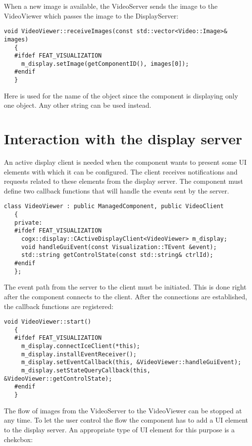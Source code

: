 When a new image is available, the VideoServer sends the image to the VideoViewer which
passes the image to the DisplayServer:

\begin{Verbatim}[fontsize=\scriptsize,gobble=3]
   void VideoViewer::receiveImages(const std::vector<Video::Image>& images)
   {
   #ifdef FEAT_VISUALIZATION
     m_display.setImage(getComponentID(), images[0]);
   #endif
   }
\end{Verbatim}

Here  is used for the name of the object since the component
is displaying only one object. Any other string can be used instead.


\section{Interaction with the display server}

An active display client is needed when the component wants to present some UI
elements with which it can be configured. The client receives notifications and
requests related to these elements from the display server. The component must
define two callback functions that will handle the events sent by the server.

\begin{Verbatim}[fontsize=\scriptsize,gobble=3]
   class VideoViewer : public ManagedComponent, public VideoClient
   {
   private:
   #ifdef FEAT_VISUALIZATION
     cogx::display::CActiveDisplayClient<VideoViewer> m_display;
     void handleGuiEvent(const Visualization::TEvent &event);
     std::string getControlState(const std::string& ctrlId);
   #endif
   };
\end{Verbatim}

The event path from the server to the client must be initiated. This is done right
after the component connects to the client. After the connections are established,
the callback functions are registered:

\begin{Verbatim}[fontsize=\scriptsize,gobble=3]
   void VideoViewer::start()
   {
   #ifdef FEAT_VISUALIZATION
     m_display.connectIceClient(*this);
     m_display.installEventReceiver();
     m_display.setEventCallback(this, &VideoViewer::handleGuiEvent);
     m_display.setStateQueryCallback(this, &VideoViewer::getControlState);
   #endif
   }
\end{Verbatim}

The flow of images from the VideoServer to the VideoViewer can be stopped at
any time. To let the user control the flow the component has to add a UI
element to the display server.  An appropriate type of UI element for this
purpose is a chekcbox:

